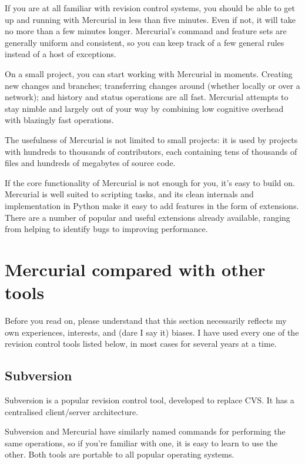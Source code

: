 If you are at all familiar with revision control systems, you should
be able to get up and running with Mercurial in less than five
minutes.  Even if not, it will take no more than a few minutes
longer.  Mercurial's command and feature sets are generally uniform
and consistent, so you can keep track of a few general rules instead
of a host of exceptions.

On a small project, you can start working with Mercurial in moments.
Creating new changes and branches; transferring changes around
(whether locally or over a network); and history and status operations
are all fast.  Mercurial attempts to stay nimble and largely out of
your way by combining low cognitive overhead with blazingly fast
operations.

The usefulness of Mercurial is not limited to small projects: it is
used by projects with hundreds to thousands of contributors, each
containing tens of thousands of files and hundreds of megabytes of
source code.

If the core functionality of Mercurial is not enough for you, it's
easy to build on.  Mercurial is well suited to scripting tasks, and
its clean internals and implementation in Python make it easy to add
features in the form of extensions.  There are a number of popular and
useful extensions already available, ranging from helping to identify
bugs to improving performance.

\section{Mercurial compared with other tools}

Before you read on, please understand that this section necessarily
reflects my own experiences, interests, and (dare I say it) biases.  I
have used every one of the revision control tools listed below, in
most cases for several years at a time.


\subsection{Subversion}

Subversion is a popular revision control tool, developed to replace
CVS.  It has a centralised client/server architecture.

Subversion and Mercurial have similarly named commands for performing
the same operations, so if you're familiar with one, it is easy to
learn to use the other.  Both tools are portable to all popular
operating systems.

